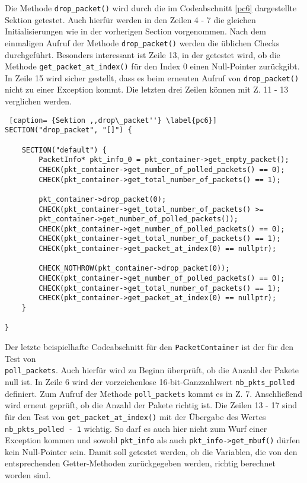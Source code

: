 \documentclass[../review_3.tex]{subfiles}
\begin{document}
Die Methode \texttt{drop\_packet()} wird durch die im Codeabschnitt \ref{pc6} dargestellte Sektion getestet. Auch hierfür werden in den Zeilen 4 - 7 die gleichen Initialisierungen wie in der vorherigen Section vorgenommen. Nach dem einmaligen Aufruf der Methode \texttt{drop\_packet()} werden die üblichen Checks durchgeführt. Besonders interessant ist Zeile 13, in der getestet wird, ob die Methode \texttt{get\_packet\_at\_index()} für den Index 0 einen Null-Pointer zurückgibt. In Zeile 15 wird sicher gestellt, dass es beim erneuten Aufruf von \texttt{drop\_packet()} nicht zu einer Exception kommt. Die letzten drei Zeilen können mit Z. 11 - 13 verglichen werden.

\begin{lstlisting} [caption= {Sektion ,,drop\_packet''} \label{pc6}]
SECTION("drop_packet", "[]") {
    
    SECTION("default") {
        PacketInfo* pkt_info_0 = pkt_container->get_empty_packet();
        CHECK(pkt_container->get_number_of_polled_packets() == 0);
        CHECK(pkt_container->get_total_number_of_packets() == 1);
        
        pkt_container->drop_packet(0);
        CHECK(pkt_container->get_total_number_of_packets() >=
        pkt_container->get_number_of_polled_packets());
        CHECK(pkt_container->get_number_of_polled_packets() == 0);
        CHECK(pkt_container->get_total_number_of_packets() == 1);
        CHECK(pkt_container->get_packet_at_index(0) == nullptr);
        
        CHECK_NOTHROW(pkt_container->drop_packet(0));
        CHECK(pkt_container->get_number_of_polled_packets() == 0);
        CHECK(pkt_container->get_total_number_of_packets() == 1);
        CHECK(pkt_container->get_packet_at_index(0) == nullptr);
    }
        
}\end{lstlisting}

Der letzte beispielhafte Codeabschnitt für den \texttt{PacketContainer} ist der für den Test von\\ \texttt{poll\_packets}. Auch hierfür wird zu Beginn überprüft, ob die Anzahl der Pakete null ist. In Zeile 6 wird der vorzeichenlose 16-bit-Ganzzahlwert \texttt{nb\_pkts\_polled} definiert. Zum Aufruf der Methode \texttt{poll\_packets} kommt es in Z. 7. Anschließend wird erneut geprüft, ob die Anzahl der Pakete richtig ist. Die Zeilen 13 - 17 sind für den Test von \texttt{get\_packet\_at\_index()} mit der Übergabe des Wertes \texttt{nb\_pkts\_polled - 1} wichtig. So darf es auch hier nicht zum Wurf einer Exception kommen und sowohl \texttt{pkt\_info} als auch \texttt{pkt\_info->get\_mbuf()} dürfen kein Null-Pointer sein. Damit soll getestet werden, ob die Variablen, die von den entsprechenden Getter-Methoden zurückgegeben werden, richtig berechnet worden sind.
\end{document}
